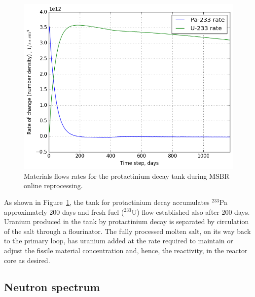 \documentclass{anstrans}
\begin{document}
\begin{figure}[htbp!] %
        \centering
        \includegraphics[width=1.03\linewidth]{rates_outflow.png}
        \caption{Materials flows rates for the protactinium decay tank during 
        \gls{MSBR} online reprocessing.}
        \label{fig:outflow}
\end{figure}
As shown in Figure~\ref{fig:outflow}, the tank for protactinium decay 
accumulates $^{233}$Pa approximately 200 days and fresh fuel ($^{233}$U) flow 
established also after 200 days. Uranium produced in the tank by protactinium 
decay is separated by circulation of the salt through a flourinator. The fully 
processed molten salt, on its way back to the primary loop, has uranium added 
at the rate required to maintain or adjust the fissile material concentration 
and, hence, the reactivity, in the reactor core as desired.

\subsection{Neutron spectrum}
\end{document}
